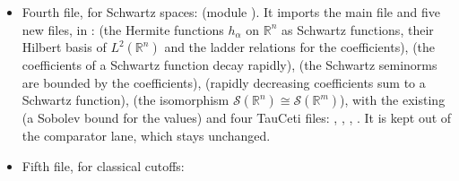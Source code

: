 \documentclass[11pt]{article}
\begin{document}
\begin{itemize}
  Neumann's theorem on self-adjoint extensions, with TauCeti's criterion behind a private
  import),\newline
   (complex conjugation on $L^2$).\newline
  It is kept out of the comparator lane for the same reason.
\item Fourth file, for Schwartz spaces:\newline
  \newline
  (module ). It imports the main file and five new
   files, in :\newline
   (the Hermite functions $h_\alpha$ on $\mathbb{R}^n$ as Schwartz
  functions, their Hilbert basis of $L^2(\mathbb{R}^n)$ and the ladder relations for the
  coefficients),\newline
   (the coefficients of a Schwartz function decay rapidly),\newline
   (the Schwartz seminorms are bounded by the coefficients),\newline
   (rapidly decreasing coefficients sum to a Schwartz
  function),\newline
   (the isomorphism $\mathcal{S}(\mathbb{R}^n) \cong
  \mathcal{S}(\mathbb{R}^m)$),\newline
  with the existing  (a
  Sobolev bound for the values) and four TauCeti files:\newline
  ,\newline
  ,\newline
  ,\newline
  .\newline
  It is kept out of the comparator lane, which stays unchanged.
\item Fifth file, for classical cutoffs:\newline
  \newline

\end{itemize}
\end{document}
